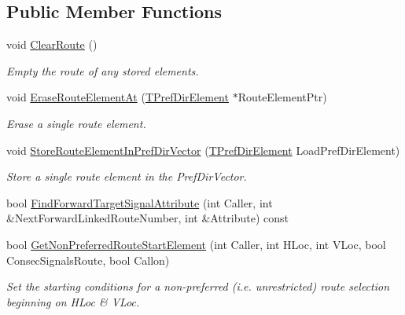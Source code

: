 \subsection*{Public Member Functions}
\begin{DoxyCompactItemize}
\item 
\mbox{\label{class_t_one_route_a05ce65e80c2272a775f6497890d42b6b}} 
void \mbox{\hyperlink{class_t_one_route_a05ce65e80c2272a775f6497890d42b6b}{Clear\+Route}} ()
\begin{DoxyCompactList}\small\item\em Empty the route of any stored elements. \end{DoxyCompactList}\item 
\mbox{\label{class_t_one_route_aed12df951a0df91bccce3d86365d9f0a}} 
void \mbox{\hyperlink{class_t_one_route_aed12df951a0df91bccce3d86365d9f0a}{Erase\+Route\+Element\+At}} (\mbox{\hyperlink{class_t_pref_dir_element}{T\+Pref\+Dir\+Element}} $\ast$Route\+Element\+Ptr)
\begin{DoxyCompactList}\small\item\em Erase a single route element. \end{DoxyCompactList}\item 
\mbox{\label{class_t_one_route_a7c359f022e985fbec06f5518bc9046b3}} 
void \mbox{\hyperlink{class_t_one_route_a7c359f022e985fbec06f5518bc9046b3}{Store\+Route\+Element\+In\+Pref\+Dir\+Vector}} (\mbox{\hyperlink{class_t_pref_dir_element}{T\+Pref\+Dir\+Element}} Load\+Pref\+Dir\+Element)
\begin{DoxyCompactList}\small\item\em Store a single route element in the Pref\+Dir\+Vector. \end{DoxyCompactList}\item 
bool \mbox{\hyperlink{class_t_one_route_a4d92e68782eea0534a02e1b8176bc730}{Find\+Forward\+Target\+Signal\+Attribute}} (int Caller, int \&Next\+Forward\+Linked\+Route\+Number, int \&Attribute) const
\item 
\mbox{\label{class_t_one_route_a43513cae58e5d18979492cbe76b51f74}} 
bool \mbox{\hyperlink{class_t_one_route_a43513cae58e5d18979492cbe76b51f74}{Get\+Non\+Preferred\+Route\+Start\+Element}} (int Caller, int H\+Loc, int V\+Loc, bool Consec\+Signals\+Route, bool Callon)
\begin{DoxyCompactList}\small\item\em Set the starting conditions for a non-\/preferred (i.\+e. unrestricted) route selection beginning on H\+Loc \& V\+Loc. \end{DoxyCompactList}\item 

\end{DoxyCompactItemize}
